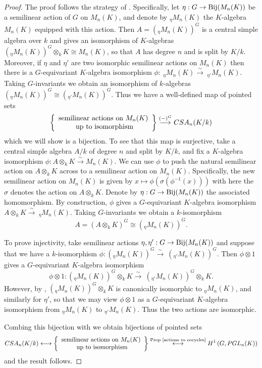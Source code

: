 \documentclass[11pt]{amsart}
\numberwithin{equation}{section}
\theoremstyle{remark}
\theoremstyle{remark}
\theoremstyle{remark}
\theoremstyle{definition}
\theoremstyle{definition}
\theoremstyle{definition}
\theoremstyle{definition}
\theoremstyle{definition}
\theoremstyle{definition}
\begin{document}
\begin{proof}
The proof follows the strategy of . Specifically, let $\eta:G\rightarrow \textup{Bij}(M_n(K))$ be a semilinear action of $G$ on $M_n(K)$, and denote by $_\eta M_n(K)$ the $K$-algebra $M_n(K)$ equipped with this action. Then $A=(_\eta M_n(K))^G$ is a central simple algebra over $k$ and  gives an isomorphism of $K$-algebras $(_\eta M_n(K))^G\otimes_k K \cong M_n(K)$, so that $A$ has degree $n$ and is split by $K/k$. Moreover, if $\eta$ and $\eta'$ are two isomorphic semilinear actions on $M_n(K)$ then there is a $G$-equivariant $K$-algebra isomorphism $\phi:~_\eta M_n(K) \stackrel{\sim}{\longrightarrow} ~_{\eta'} M_n(K)$. Taking $G$-invariants we obtain an isomorphism of $k$-algebras $(_\eta M_n(K))^G\cong (_{\eta'} M_n(K))^G$. Thus we have a well-defined map of pointed sets 
\[\left\{\begin{array}{c}\textup{semilinear actions on }M_n(K)\\\textup{ up to isomorphism}\end{array}\right\}  \stackrel{(-)^G}{\longrightarrow} CSA_n(K/k)\]
which we will show is a bijection. To see that this map is surjective, take a central simple algebra $A/k$ of degree $n$ and split by $K/k$, and fix a $K$-algebra isomorphism $\phi:A\otimes_k K \stackrel{\sim}{\longrightarrow} M_n(K)$. We can use $\phi$ to push the natural semilinear action on $A\otimes_k K$  across to a semilinear action on $M_n(K)$. Specifically, the new semilinear action on $M_n(K)$ is given by $x\mapsto \phi(\sigma(\phi^{-1}(x)))$ with here the $\sigma$ denotes the action on $A\otimes_k K$. Denote by $\eta:G\rightarrow \textup{Bij}(M_n(K))$ the associated homomorphism. By construction, $\phi$ gives a $G$-equivariant $K$-algebra isomorphism  $A\otimes_k K \stackrel{\sim}{\longrightarrow} ~_\eta M_n(K)$. Taking $G$-invariants we obtain a $k$-isomorphism
\[A=(A\otimes_k K)^G\cong (_\eta M_n(K))^G.\]

To prove injectivity, take semilinear actions $\eta,\eta':G\rightarrow \textup{Bij}(M_n(K))$ and suppose that we have a $k$-isomorphism $\phi:(_\eta M_n(K))^G \stackrel{\sim}{\longrightarrow} ~(_{\eta'} M_n(K))^G$. Then $\phi\otimes 1$ gives a $G$-equivariant $K$-algebra isomorphism
\[\phi\otimes 1: (_\eta M_n(K))^G\otimes_k K \stackrel{\sim}{\longrightarrow} ~(_{\eta'} M_n(K))^G\otimes_k K.\]
However, by , $(_\eta M_n(K))^G\otimes_k K$ is canonically isomorphic to $_\eta M_n(K)$, and similarly for $\eta'$, so that we may view $\phi \otimes 1$ as a $G$-equivariant $K$-algebra isomorphism from $_\eta M_n(K)$ to $_{\eta'} M_n(K)$. Thus the two actions are isomorphic. 

Combing this bijection with  we obtain bijections of pointed sets
\[CSA_n(K/k) \longleftrightarrow  \left\{\begin{array}{c}\textup{semilinear actions on }M_n(K)\\\textup{ up to isomorphism}\end{array}\right\}\stackrel{\textup{Prop \ref{actions vs cocycles}}}{\longleftrightarrow} H^1\left(G,PGL_n(K)\right)\]
and the result follows.
\end{proof}
\end{document}
